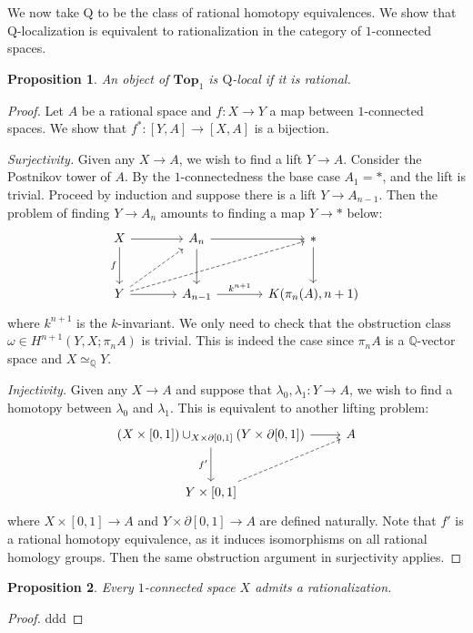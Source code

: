 \documentclass[psamsfonts]{amsart}
\newtheorem{prop}{Proposition}[section]
\theoremstyle{definition}
\newcommand{\Q}{\mathbb{Q}}
\newcommand{\Top}{\mathbf{Top}}
\numberwithin{equation}{section}
\begin{document}
We now take $\mathrm{Q}$ to be the class of rational homotopy equivalences. We show that $\mathrm{Q}$-localization is equivalent to rationalization in the category of $1$-connected spaces.

\begin{prop}
An object of $\Top_1$ is $\mathrm{Q}$-local if it is rational.
\end{prop}
\begin{proof}
Let $A$ be a rational space and $f:X\to Y$ a map between $1$-connected spaces. We show that $f^\ast:[Y,A]\to[X,A]$ is a bijection.\medbreak

\textit{Surjectivity.} Given any $X\to A$, we wish to find a lift $Y\to A$. Consider the Postnikov tower of $A$. By the $1$-connectedness the base case $A_1=\ast$, and the lift is trivial. Proceed by induction and suppose there is a lift $Y\to A_{n-1}$. Then the problem of finding $Y\to A_n$ amounts to finding a map $Y\to\ast$ below:
\[\begin{tikzcd}[column sep=large, row sep=large]
X\arrow[d,"f"']\arrow[r]&A_n\arrow[d]\arrow[r]&\ast\arrow[d]\\
Y\arrow[r]\arrow[urr,dashed]\arrow[ur,dashed]&A_{n-1}\arrow[r,"k^{n+1}"]&K(\pi_n(A),n+1)
\end{tikzcd}\]
where $k^{n+1}$ is the $k$-invariant. We only need to check that the obstruction class $\omega\in H^{n+1}(Y,X;\pi_nA)$ is trivial. This is indeed the case since $\pi_nA$ is a $\Q$-vector space and $X\simeq_\Q Y$.\medbreak

\textit{Injectivity.} Given any $X\to A$ and suppose that $\lambda_0,\lambda_1:Y\to A$, we wish to find a homotopy between $\lambda_0$ and $\lambda_1$. This is equivalent to another lifting problem:
\[\begin{tikzcd}[row sep=large]
(X\times[0,1])\cup_{X\times\partial[0,1]}(Y\times\partial[0,1])\arrow[r]\arrow[d,"f'"']&A\\
Y\times[0,1]\arrow[ur,dashed]
\end{tikzcd}\]
where $X\times[0,1]\to A$ and $Y\times\partial[0,1]\to A$ are defined naturally. Note that $f'$ is a rational homotopy equivalence, as it induces isomorphisms on all rational homology groups. Then the same obstruction argument in surjectivity applies.
\end{proof}

\begin{prop}
Every $1$-connected space $X$ admits a rationalization.
\end{prop}
\begin{proof}
ddd
\end{proof}
\end{document}
